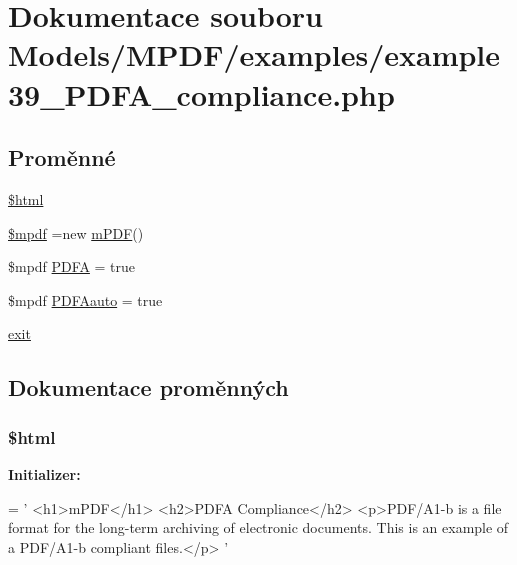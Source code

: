 \hypertarget{example39___p_d_f_a__compliance_8php}{\section{Dokumentace souboru Models/\-M\-P\-D\-F/examples/example39\-\_\-\-P\-D\-F\-A\-\_\-compliance.php}
\label{example39___p_d_f_a__compliance_8php}
}
\subsection*{Proměnné}
\begin{DoxyCompactItemize}
\item 
\hyperlink{example39___p_d_f_a__compliance_8php_a6f96e7fc92441776c9d1cd3386663b40}{\$html}
\item 
\hyperlink{example39___p_d_f_a__compliance_8php_ad028f81910d6cbab9b184d2214b3a8f8}{\$mpdf} =new \hyperlink{classm_p_d_f}{m\-P\-D\-F}()
\item 
\$mpdf \hyperlink{example39___p_d_f_a__compliance_8php_af1f0b2f4d30920065eee1b7a894814bf}{P\-D\-F\-A} = true
\item 
\$mpdf \hyperlink{example39___p_d_f_a__compliance_8php_a3c2bbcdfcaa3db0addfcfd9c7b6175b2}{P\-D\-F\-Aauto} = true
\item 
\hyperlink{example39___p_d_f_a__compliance_8php_a6733eb5f605d09eaede9845835d71c4e}{exit}
\end{DoxyCompactItemize}


\subsection{Dokumentace proměnných}
\hypertarget{example39___p_d_f_a__compliance_8php_a6f96e7fc92441776c9d1cd3386663b40}{
\subsubsection[{\$html}]{\setlength{\rightskip}{0pt plus 5cm}\$html}}\label{example39___p_d_f_a__compliance_8php_a6f96e7fc92441776c9d1cd3386663b40}
{\bfseries Initializer\-:}
\begin{DoxyCode}
= \textcolor{stringliteral}{'}
\textcolor{stringliteral}{<h1>mPDF</h1>}
\textcolor{stringliteral}{<h2>PDFA Compliance</h2>}
\textcolor{stringliteral}{<p>PDF/A1-b is a file format for the long-term archiving of electronic documents. This is an example of a
       PDF/A1-b compliant files.</p>}
\textcolor{stringliteral}{'}
\end{DoxyCode}


